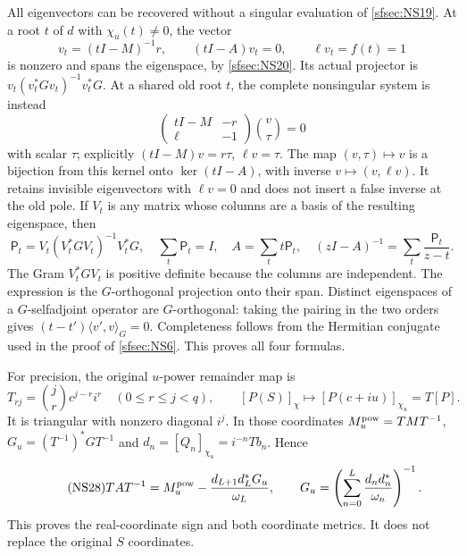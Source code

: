 All eigenvectors can be recovered without a singular
evaluation of \eqref{sfsec:NS19}. At a root $t$ of $d$ with
$\chi_u(t)\ne0$, the vector
\begin{equation}\tag{NS24}\label{sfsec:NS24}
v_t=(tI-M)^{-1}r,\qquad
(tI-A)v_t=0,\qquad \ell v_t=f(t)=1
\end{equation}
is nonzero and spans the eigenspace, by \eqref{sfsec:NS20}.
Its actual projector is
$v_t(v_t^*Gv_t)^{-1}v_t^*G$.
At a shared old root $t$, the complete nonsingular
system is instead
\begin{equation}\tag{NS25}\label{sfsec:NS25}
\begin{pmatrix}tI-M&-r\\ \ell&-1\end{pmatrix}
\binom v\tau=0
\end{equation}
with scalar $\tau$; explicitly
$(tI-M)v=r\tau$, $\ell v=\tau$.
The map $(v,\tau)\mapsto v$ is a bijection from this
kernel onto $\ker(tI-A)$, with inverse
$v\mapsto(v,\ell v)$. It retains invisible eigenvectors
with $\ell v=0$ and does not insert a false inverse
at the old pole. If $V_t$ is any matrix whose columns
are a basis of the resulting eigenspace, then
\begin{equation}\tag{NS26}\label{sfsec:NS26}
\mathsf P_t=V_t(V_t^*GV_t)^{-1}V_t^*G,\quad
\sum_t\mathsf P_t=I,\quad
A=\sum_t t\mathsf P_t,\quad
(zI-A)^{-1}=\sum_t\frac{\mathsf P_t}{z-t}.
\end{equation}
The Gram $V_t^*GV_t$ is positive definite because the
columns are independent. The expression is the
$G$-orthogonal projection onto their span. Distinct
eigenspaces of a $G$-selfadjoint operator are
$G$-orthogonal: taking the pairing in the two orders
gives $(t-t')\langle v',v\rangle_G=0$.
Completeness follows from the Hermitian conjugate used
in the proof of \eqref{sfsec:NS6}. This proves all four formulas.

For precision, the original $u$-power remainder map is
\begin{equation}\tag{NS27}\label{sfsec:NS27}
T_{rj}=\binom jr c^{j-r}i^r\quad(0\leq r\leq j<q),\qquad
[P(S)]_\chi\longmapsto[P(c+iu)]_{\chi_u}=T[P].
\end{equation}
It is triangular with nonzero diagonal $i^j$.
In those coordinates
$M_u^{\rm pow}=TMT^{-1}$,
$G_u=(T^{-1})^*GT^{-1}$ and
$d_n=[Q_n]_{\chi_u}=i^{-n}Tb_n$. Hence
\begin{equation}\tag{NS28}\label{sfsec:NS28}
TAT^{-1}
=M_u^{\rm pow}-\frac{d_{L+1}d_L^*G_u}{\omega_L},\qquad
G_u=\left(\sum_{n=0}^L
\frac{d_nd_n^*}{\omega_n}\right)^{-1}.
\end{equation}
This proves the real-coordinate sign and both coordinate
metrics. It does not replace the original $S$ coordinates.

